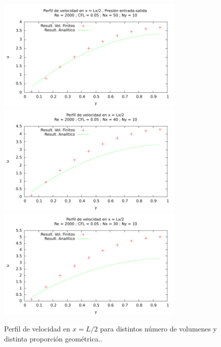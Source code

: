 \begin{figure} [H]
\centering
\includegraphics[width=0.8\textwidth]{./fig1_1/fig1_1/velocity_profile.pdf}
\includegraphics[width=0.8\textwidth]{./fig1_1/fig1_2/velocity_profile.pdf}
\includegraphics[width=0.8\textwidth]{./fig1_1/fig1_3/velocity_profile.pdf}
\caption{Perfil de velocidad en $x=L/2$ para distintos número de volumenes y distinta proporción geométrica.. } \label{fig_3}
\end{figure}
